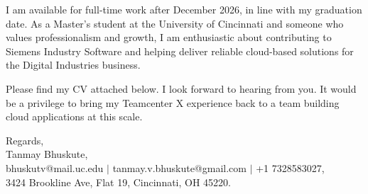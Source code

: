 \documentclass[11pt]{letter}
\begin{document}
\begin{letter}{}
I am available for full-time work after December 2026, in line with my graduation date. As a Master's student at the University of Cincinnati and someone who values professionalism and growth, I am enthusiastic about contributing to Siemens Industry Software and helping deliver reliable cloud-based solutions for the Digital Industries business.

Please find my CV attached below. I look forward to hearing from you. It would be a privilege to bring my Teamcenter X experience back to a team building cloud applications at this scale.

{\setlength{\parskip}{0pt}
Regards,\\
Tanmay Bhuskute,\\
bhuskutv@mail.uc.edu $\mid$ tanmay.v.bhuskute@gmail.com $\mid$ +1 7328583027,\\
3424 Brookline Ave, Flat 19, Cincinnati, OH 45220.
}

\end{letter}
\end{document}
